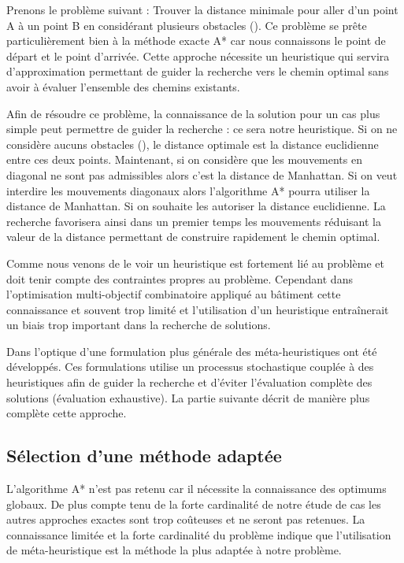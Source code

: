 Prenons le problème suivant : Trouver la distance minimale pour aller d’un point A à un point B
en considérant plusieurs obstacles ().
Ce problème se prête particulièrement bien à la méthode exacte A* car nous connaissons
le point de départ et le point d’arrivée. Cette approche nécessite un heuristique
qui servira d’approximation permettant de guider la recherche vers le chemin optimal
sans avoir à évaluer l’ensemble des chemins existants.

Afin de résoudre ce problème, la connaissance de la solution pour un cas plus simple
peut permettre de guider la recherche : ce sera notre heuristique.
Si on ne considère aucuns obstacles (), le distance optimale
est la distance euclidienne entre ces deux points. Maintenant, si on considère que
les mouvements en diagonal ne sont pas admissibles alors c’est la distance de Manhattan.
Si on veut interdire les mouvements diagonaux alors l’algorithme A* pourra utiliser
la distance de Manhattan. Si on souhaite les autoriser la distance euclidienne.
La recherche favorisera ainsi dans un premier temps les mouvements réduisant la
valeur de la distance permettant de construire rapidement le chemin optimal.


Comme nous venons de le voir un heuristique est fortement lié au problème et doit tenir
compte des contraintes propres au problème. Cependant dans l’optimisation multi-objectif combinatoire
appliqué au bâtiment cette connaissance et souvent trop limité et l’utilisation
d’un heuristique entraînerait un biais trop important dans la recherche de solutions.

Dans l’optique d’une formulation plus générale des méta-heuristiques ont été développés.
Ces formulations utilise un processus stochastique couplée à des heuristiques afin de guider
la recherche et d’éviter l’évaluation complète des solutions (évaluation exhaustive). La partie
suivante décrit de manière plus complète cette approche.



\subsection{Sélection d’une méthode adaptée} %
\label{sub:selection_d_une_methode_adaptee}
L’algorithme A* n’est pas retenu car il nécessite la connaissance des optimums globaux.
De plus compte tenu de la forte cardinalité de notre étude de cas les autres approches exactes
sont trop coûteuses et ne seront pas retenues.
La connaissance limitée et la forte cardinalité du problème indique que l’utilisation
de méta-heuristique est la méthode la plus adaptée à notre problème.




